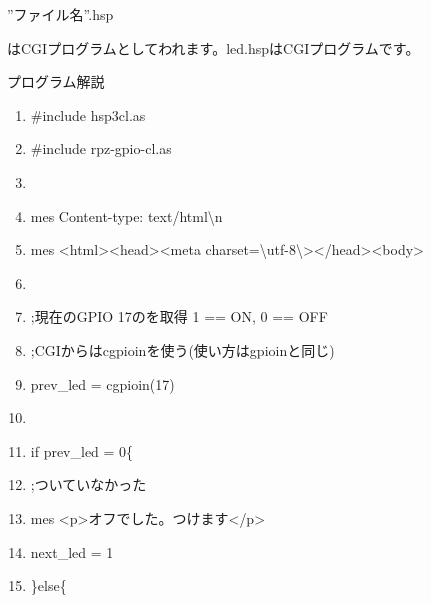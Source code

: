 \documentclass[a4paper,12pt,dvipdfmx]{jarticle}
\begin{document}
”ファイル名”.hsp

はCGIプログラムとしてわれます。led.hspはCGIプログラムです。


\bigskip

\clearpage
プログラム解説



\centering
\begin{boxedminipage}{0.95\textwidth}

	\begin{enumerate}
	\setlength{\itemsep}{0cm}
	\item \#include {\textquotedbl}hsp3cl.as{\textquotedbl}

	\item \#include {\textquotedbl}rpz-gpio-cl.as{\textquotedbl}


	\item

	\item mes {\textquotedbl}Content-type: text/html{\textbackslash}n{\textquotedbl}

	\item mes {\textquotedbl}{\textless}html{\textgreater}{\textless}head{\textgreater}{\textless}meta
	charset={\textbackslash}{\textquotedbl}utf-8{\textbackslash}{\textquotedbl}{\textgreater}{\textless}/head{\textgreater}{\textless}body{\textgreater}{\textquotedbl}


	\item

	\item ;現在のGPIO 17のを取得 1 == ON, 0 == OFF

	\item ;CGIからはcgpioinを使う(使い方はgpioinと同じ)

	\item prev\_led = cgpioin(17)

	\item

	\item if prev\_led = 0\{

	\item ;ついていなかった

	\item mes
		{\textquotedbl}{\textless}p{\textgreater}オフでした。つけます{\textless}/p{\textgreater}{\textquotedbl}

	\item next\_led = 1

	\item \}else\{


\end{enumerate}
\end{boxedminipage}
\end{document}

